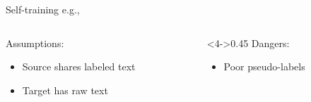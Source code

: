 \documentclass[14pt]{beamer}
\begin{document}
\begin{frame}{Self-training \hfill\small e.g., \cite{yarowsky-1995-unsupervised,ruder-plank-2018-strong}}

\begin{columns}
\begin{column}{0.53\textwidth}
Assumptions:
\begin{itemize}
\item Source shares labeled text
\item Target has raw text
\end{itemize}
\end{column}
\begin{column}<4->{0.45\textwidth}
Dangers:
\begin{itemize}
\item Poor pseudo-labels
\end{itemize}
\end{column}
\end{columns}
\end{frame}
\end{document}
